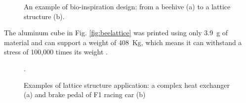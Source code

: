 \begin{figure}
    \centering
    \quad
    \caption[Bio-inspiration design.]{An example of bio-inspiration design: from a beehive (a) to a lattice structure (b).}
    \label{fig:bioinsp}
\end{figure}
The aluminum cube in Fig. \ref{fig:beelattice} was printed using only \SI{3.9}{g} of material and can support a weight of \SI{408}{Kg}, which means it can withstand a stress of 100,000 times its weight \cite{noauthor_3d_2014}. 
\begin{figure}
    \centering
    \qquad
    \caption[Lattice structure applications.]{Examples of lattice structure application: a complex heat exchanger (a) and brake pedal of F1 racing car (b) \cite{milewski_additive_2017, du_plessis_beautiful_2019}}.
\end{figure}
